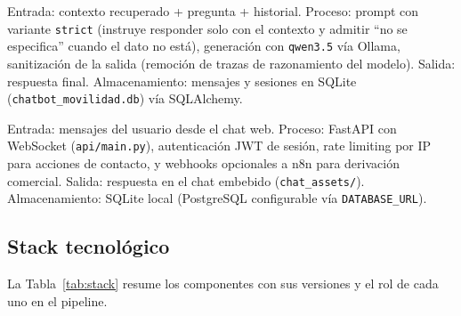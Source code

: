 \documentclass[11pt,a4paper]{article}
\newcommand{\code}[1]{\texttt{#1}}
\begin{document}
\begin{description}[style=nextline]
    \item[Generación y verificación.] Entrada: contexto recuperado +
    pregunta + historial. Proceso: prompt con variante \code{strict} (instruye
    responder solo con el contexto y admitir ``no se especifica'' cuando el
    dato no está), generación con \code{qwen3.5} vía Ollama, sanitización de
    la salida (remoción de trazas de razonamiento del modelo). Salida:
    respuesta final. Almacenamiento: mensajes y sesiones en SQLite
    (\code{chatbot\_movilidad.db}) vía SQLAlchemy.

    \item[Serving.] Entrada: mensajes del usuario desde el chat web. Proceso:
    FastAPI con WebSocket (\code{api/main.py}), autenticación JWT de sesión,
    rate limiting por IP para acciones de contacto, y webhooks opcionales a
    n8n para derivación comercial. Salida: respuesta en el chat embebido
    (\code{chat\_assets/}). Almacenamiento: SQLite local (PostgreSQL
    configurable vía \code{DATABASE\_URL}).
\end{description}

\subsection{Stack tecnológico}

La Tabla~\ref{tab:stack} resume los componentes con sus versiones y el rol
de cada uno en el pipeline.
\end{document}
